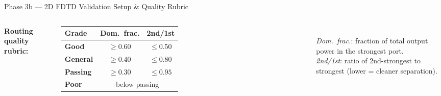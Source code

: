 \documentclass[aspectratio=169,10pt]{beamer}
\begin{document}
\begin{frame}{Phase 3b — 2D FDTD Validation Setup \& Quality Rubric}
\begin{columns}[T]
      \textbf{Routing quality rubric:}\\[4pt]
      \small
      \renewcommand{\arraystretch}{1.25}
      \begin{tabular}{lcc}
        \toprule
        Grade & Dom.\ frac. & 2nd/1st \\
        \midrule
        \textcolor{good_green}{\textbf{Good}}      & $\geq 0.60$ & $\leq 0.50$ \\
        \textcolor{passing_blue}{\textbf{General}} & $\geq 0.40$ & $\leq 0.80$ \\
        \textbf{Passing}                           & $\geq 0.30$ & $\leq 0.95$ \\
        \textcolor{poor_red}{\textbf{Poor}}        & \multicolumn{2}{c}{below passing} \\
        \bottomrule
      \end{tabular}
      \vspace{6pt}\\
      \footnotesize
      \textit{Dom.\ frac.}: fraction of total output power in the strongest port.\\[2pt]
      \textit{2nd/1st}: ratio of 2nd-strongest to strongest (lower = cleaner separation).
  \end{columns}
\end{frame}
\end{document}
